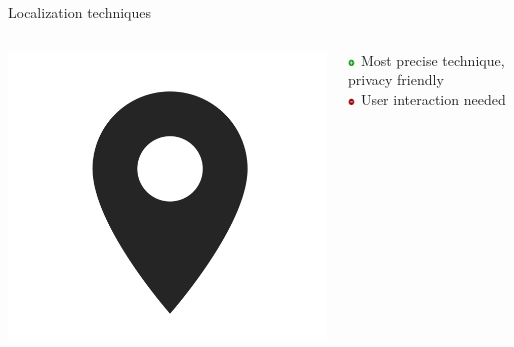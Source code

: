 \documentclass[11pt]{beamer}
\begin{document}
\begin{frame}[t]{Localization techniques}

  \begin{columns}[c]

    \begin{column}{0.2\textwidth}
      \includegraphics[width=\textwidth]{location-symbol}
    \end{column}

    \hfill

    \begin{column}{0.8\textwidth}

      \includegraphics[width=0.05\textwidth]{plus} Most precise technique, privacy friendly\\
      \includegraphics[width=0.05\textwidth]{minus} User interaction needed

    \end{column}

  \end{columns}


\end{frame}
\end{document}
